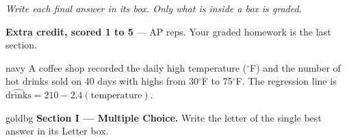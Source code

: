 \documentclass[12pt]{article}
\begin{document}
{\small\itshape Write each final answer in its box. Only what is inside a box is graded.}\par

\vspace{0.06in}

\boxguard[8]
\begin{remindbox}
\small
\textbf{Extra credit, scored 1 to 5} --- AP reps. Your graded homework is the last section.
\end{remindbox}

\vspace{0.08in}

\boxguard[10]
\begin{scenariobox}{navy}
\small
A coffee shop recorded the daily high temperature ($^\circ$F) and the number of hot drinks
sold on 40 days with highs from 30$^\circ$F to 75$^\circ$F. The regression line is
\ $\widehat{\text{drinks}} = 210 - 2.4(\text{temperature})$.
\end{scenariobox}

\vspace{0.08in}

\boxguard[12]
\begin{headlinebox}{goldbg}
\small
\textbf{Section I --- Multiple Choice.} Write the letter of the single best answer in its Letter box.
\end{headlinebox}
\end{document}
